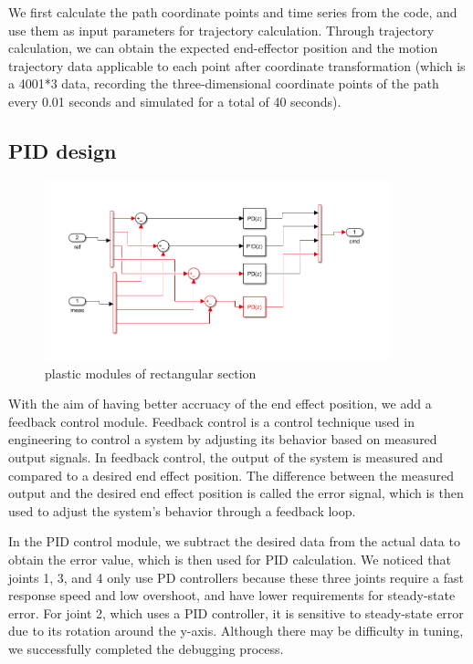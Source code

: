 We first calculate the path coordinate points and time series from the code, and use them as input parameters for trajectory calculation. Through trajectory calculation, we can obtain the expected end-effector position and the motion trajectory data applicable to each point after coordinate transformation (which is a 4001*3 data, recording the three-dimensional coordinate points of the path every 0.01 seconds and simulated for a total of 40 seconds).


\subsection{PID design}

\begin{figure}[htbp]
    \centering
    \includegraphics[width=10cm]{./fig/PID.png}
    \caption{plastic modules of rectangular section}
    \label{f1}
\end{figure}


With the aim of having better accruacy of the end effect position, we add a feedback control module. Feedback control is a control technique used in engineering to control a system by adjusting its behavior based on measured output signals. In feedback control, the output of the system is measured and compared to a desired end effect position. The difference between the measured output and the desired end effect position is called the error signal, which is then used to adjust the system's behavior through a feedback loop.

In the PID control module, we subtract the desired data from the actual data to obtain the error value, which is then used for PID calculation. We noticed that joints 1, 3, and 4 only use PD controllers because these three joints require a fast response speed and low overshoot, and have lower requirements for steady-state error. For joint 2, which uses a PID controller, it is sensitive to steady-state error due to its rotation around the y-axis. Although there may be difficulty in tuning, we successfully completed the debugging process.


